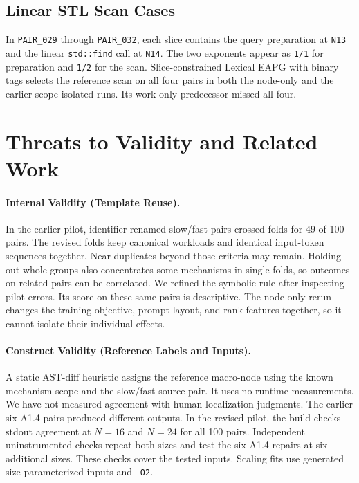 \subsection{Linear STL Scan Cases}
In \texttt{PAIR\_029} through \texttt{PAIR\_032}, each slice contains the query preparation at \texttt{N13} and the linear \texttt{std::find} call at \texttt{N14}. The two exponents appear as \texttt{1/1} for preparation and \texttt{1/2} for the scan. Slice-constrained Lexical EAPG with binary tags selects the reference scan on all four pairs in both the node-only and the earlier scope-isolated runs. Its work-only predecessor missed all four.

\section{Threats to Validity and Related Work}
\label{sec:threats_to_validity}

\paragraph{Internal Validity (Template Reuse).}
In the earlier pilot, identifier-renamed slow/fast pairs crossed folds for 49 of 100 pairs. The revised folds keep canonical workloads and identical input-token sequences together. Near-duplicates beyond those criteria may remain. Holding out whole groups also concentrates some mechanisms in single folds, so outcomes on related pairs can be correlated. We refined the symbolic rule after inspecting pilot errors. Its score on these same pairs is descriptive. The node-only rerun changes the training objective, prompt layout, and rank features together, so it cannot isolate their individual effects.

\paragraph{Construct Validity (Reference Labels and Inputs).}
A static AST-diff heuristic assigns the reference macro-node using the known mechanism scope and the slow/fast source pair. It uses no runtime measurements. We have not measured agreement with human localization judgments. The earlier six A1.4 pairs produced different outputs. In the revised pilot, the build checks stdout agreement at $N=16$ and $N=24$ for all 100 pairs. Independent uninstrumented checks repeat both sizes and test the six A1.4 repairs at six additional sizes. These checks cover the tested inputs. Scaling fits use generated size-parameterized inputs and \texttt{-O2}.

